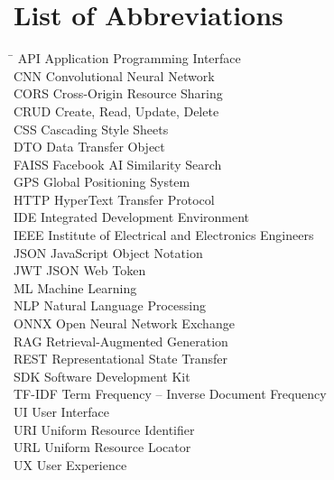 \chapter*{List of Abbreviations}

\begin{tabbing}
\hspace{4cm}\= \kill
API \> Application Programming Interface \\[4pt]
CNN \> Convolutional Neural Network \\[4pt]
CORS \> Cross-Origin Resource Sharing \\[4pt]
CRUD \> Create, Read, Update, Delete \\[4pt]
CSS \> Cascading Style Sheets \\[4pt]
DTO \> Data Transfer Object \\[4pt]
FAISS \> Facebook AI Similarity Search \\[4pt]
GPS \> Global Positioning System \\[4pt]
HTTP \> HyperText Transfer Protocol \\[4pt]
IDE \> Integrated Development Environment \\[4pt]
IEEE \> Institute of Electrical and Electronics Engineers \\[4pt]
JSON \> JavaScript Object Notation \\[4pt]
JWT \> JSON Web Token \\[4pt]
ML \> Machine Learning \\[4pt]
NLP \> Natural Language Processing \\[4pt]
ONNX \> Open Neural Network Exchange \\[4pt]
RAG \> Retrieval-Augmented Generation \\[4pt]
REST \> Representational State Transfer \\[4pt]
SDK \> Software Development Kit \\[4pt]
TF-IDF \> Term Frequency -- Inverse Document Frequency \\[4pt]
UI \> User Interface \\[4pt]
URI \> Uniform Resource Identifier \\[4pt]
URL \> Uniform Resource Locator \\[4pt]
UX \> User Experience \\[4pt]
\end{tabbing}

\newpage
